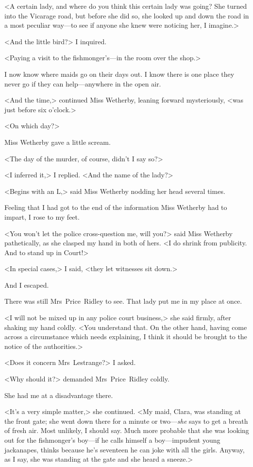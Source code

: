 <A certain lady, and where do you think this certain lady was going? She turned into the Vicarage road, but before she did so, she looked up and down the road in a most peculiar way—to see if anyone she knew were noticing her, I imagine.>

<And the little bird?> I inquired.

<Paying a visit to the fishmonger's—in the room over the shop.>

I now know where maids go on their days out. I know there is one place they never go if they can help—anywhere in the open air.

<And the time,> continued Miss Wetherby, leaning forward mysteriously, <was just before six o'clock.>

<On which day?>

Miss Wetherby gave a little scream.

<The day of the murder, of course, didn't I say so?>

<I inferred it,> I replied. <And the name of the lady?>

<Begins with an L,> said Miss Wetherby nodding her head several times.

Feeling that I had got to the end of the information Miss Wetherby had to impart, I rose to my feet.

<You won't let the police cross-question me, will you?> said Miss Wetherby pathetically, as she clasped my hand in both of hers. <I do shrink from publicity. And to stand up in Court!>

<In special cases,> I said, <they let witnesses sit down.>

And I escaped.

There was still Mrs~Price~Ridley to see. That lady put me in my place at once.

<I will not be mixed up in any police court business,> she said firmly, after shaking my hand coldly. <You understand that. On the other hand, having come across a circumstance which needs explaining, I think it should be brought to the notice of the authorities.>

<Does it concern Mrs~Lestrange?> I asked.

<Why should it?> demanded Mrs~Price~Ridley coldly.

She had me at a disadvantage there.

<It's a very simple matter,> she continued. <My maid, Clara, was standing at the front gate; she went down there for a minute or two—\emph{she} says to get a breath of fresh air. Most unlikely, I should say. Much more probable that she was looking out for the fishmonger's boy—if he calls himself a boy—impudent young jackanapes, thinks because he's seventeen he can joke with all the girls. Anyway, as I say, she was standing at the gate and she heard a sneeze.>

